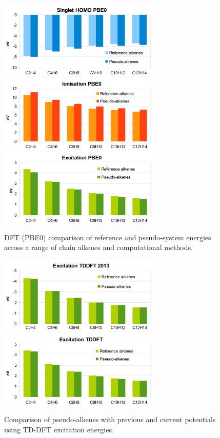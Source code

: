 \documentclass[journal=jctcce,manuscript=article]{achemso}
\begin{document}
\begin{figure}[h]
\includegraphics[width=8cm]{pbe0_homo}
\includegraphics[width=8cm]{pbe0_ionisation}
\includegraphics[width=8cm]{pbe0_excitation}
\caption{DFT (PBE0) comparison of reference and pseudo-system energies across a range of chain alkenes and computational methods.}
\label{fig:alkenes_hf_dft}
\end{figure}
\begin{figure}[h]
\includegraphics[width=8cm]{tddft_excitation_cd}
\includegraphics[width=8cm]{tddft_excitation}
\caption{Comparison of pseudo-alkenes with previous\cite{drujon_pseudopotentials_2013} and current potentials using TD-DFT excitation energies.}
\label{fig:alkenes_tddft}
\end{figure}
\end{document}
